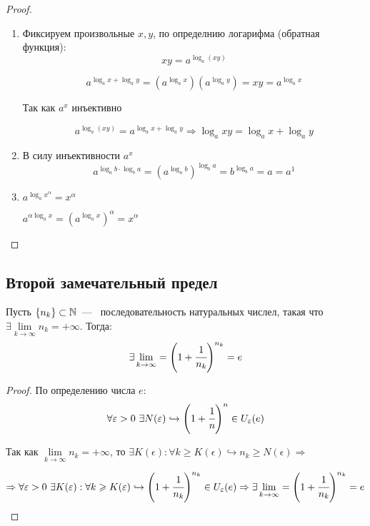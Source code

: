 \begin{proof}  

\begin{enumerate}
    \item Фиксируем произвольные $x, y$, по определнию логарифма (обратная функция):
    $$xy = a^{\log_{a}(xy)}$$

    $$a^{ \log_a x + \log_a y } = (a^{ \log_a x})(a^{ \log_a y}) = xy = a^{ \log_a x}$$

    Так как $a^{x}$ инъективно
    
    $$a^{\log_{a}(xy)} = a^{\log_{a} x + \log_{a} y} \Rightarrow \log_{a} xy = \log_{a} x + \log_{a} y$$
    \item В силу инъективности $a^{x}$
    $$a^{\log_{a}b \cdot \log_{b} a} = \left( a^{\log_{a} b}\right)^{\log_{b} a} = b^{\log_{b} a} = a = a^{1}$$
    \item  $a^{\log_{a} x^{\alpha}} = x^{\alpha}$
    
    $
        a^{\alpha \log_{a} x} =\left(a^{\log_{a} x}\right)^{\alpha} = x^{\alpha}
    $
\end{enumerate}
\end{proof}

\subsection{Второй замечательный предел}
\begin{lemma}
     Пусть $\{n_{k}\}\subset \N$~---~ последовательность натуральных числел, такая что $\exists \lim\limits_{k \to \infty} n_{k} = +\infty$. Тогда:
     $$
     \exists \lim\limits_{k \to \infty} = \left( 1 +\cfrac{1}{n_{k}}\right)^{n_{k}} = e
     $$
\end{lemma}
\begin{proof}
    По определению числа $e$:
    $$
    \forall \epsilon > 0 \ \exists N(\epsilon) \hookrightarrow \left( 1 + \cfrac{1}{n}\right)^{n} \in U_{\epsilon}(e)
    $$

    Так как $\lim\limits_{k \to \infty} n_{k} = +\infty$, то $\exists K(\epsilon): \forall k \geq K(\epsilon) \hookrightarrow n_{k} \geq N(\epsilon) \Rightarrow$

    $$ \Rightarrow\forall \epsilon > 0 \ \exists K(\epsilon): \forall k \geq K(\epsilon) \hookrightarrow \left(1 + \cfrac{1}{n_{k}}\right)^{n_{k}} \in U_{\epsilon}(e) \Rightarrow \exists \lim\limits_{k \to \infty} = \left( 1 +\cfrac{1}{n_{k}}\right)^{n_{k}} = e$$
\end{proof}

